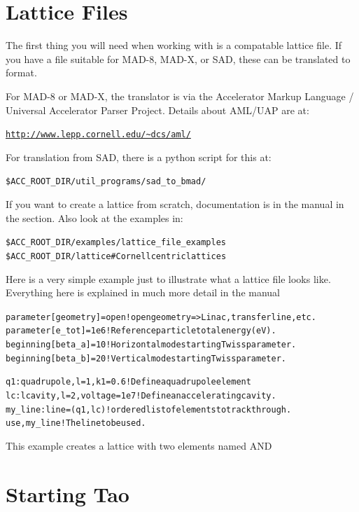\documentclass{hitec}
\newcommand{\Section}[1]{\section{#1}\vspace*{-1ex}}
\newenvironment{display}
  {\vspace*{-1.5ex} \begin{alltt}}
  {\end{alltt} \vspace*{-1.0ex}}
\begin{document}
\Section{Lattice Files}

The first thing you will need when working with \bmad is a \bmad compatable lattice file.
If you have a file suitable for MAD-8, MAD-X, or SAD, these can be translated to \bmad
format. 

For MAD-8 or MAD-X, the translator is via the Accelerator Markup Language /
Universal Accelerator Parser Project. Details about AML/UAP are at:
\begin{display}
  \url{http://www.lepp.cornell.edu/~dcs/aml/}
\end{display}

For translation from SAD, there is a python script for this at:
\begin{display}
   \$ACC_ROOT_DIR/util_programs/sad_to_bmad/
\end{display}

If you want to create a \bmad lattice from scratch, documentation is in the \bmad manual
in the  section. Also look at the examples in:
\begin{display}
  \$ACC_ROOT_DIR/examples/lattice_file_examples
  \$ACC_ROOT_DIR/lattice           # Cornell centric lattices
\end{display}

Here is a very simple example just to illustrate what a lattice file looks
like. Everything here is explained in much more detail in the \bmad manual
\begin{display}
  parameter[geometry] = open     ! open geometry => Linac, transfer line, etc.
  parameter[e_tot] = 1e6         ! Reference particle total energy (eV).
  beginning[beta_a] = 10         ! Horizontal mode starting Twiss parameter.
  beginning[beta_b] = 20         ! Vertical mode starting Twiss parameter.

  q1: quadrupole, l = 1, k1 = 0.6   ! Define a quadrupole element
  lc: lcavity, l = 2, voltage = 1e7 ! Define an accelerating cavity.
  my_line: line = (q1, lc)          ! ordered list of elements to track through.
  use, my_line                      ! The line to be used.
\end{display}
This example creates a lattice with two elements named  AND 

\section{Starting Tao}
\end{document}
